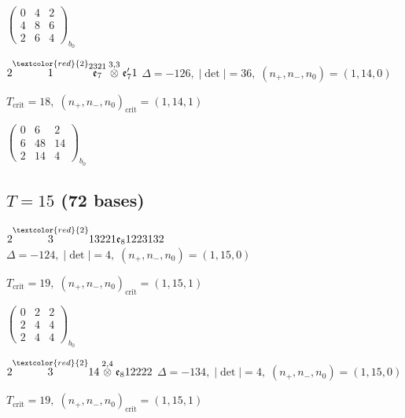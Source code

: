 \documentclass[10pt]{article}
\begin{document}
\hspace{2em}$\left(\begin{smallmatrix}0 & 4 & 2 \\ 4 & 8 & 6 \\ 2 & 6 & 4\end{smallmatrix}\right)_{\!b_0}$

\smallskip

$2\overset{\textcolor{red}{2}}{1}\overset{2321}{\mathfrak{e}_7}\overset{3,3}{\otimes}\mathfrak{e}_7'1$ \quad $\Delta=-126,\; |\det|=36,\; (n_+,n_-,n_0)=(1,14,0)$

\hspace{1em}$T_{\text{crit}}=18,\; (n_+,n_-,n_0)_{\text{crit}}=(1,14,1)$

\hspace{2em}$\left(\begin{smallmatrix}0 & 6 & 2 \\ 6 & 48 & 14 \\ 2 & 14 & 4\end{smallmatrix}\right)_{\!b_0}$


\subsection*{$T = 15$ \quad (72 bases)}
\smallskip

$2\overset{\textcolor{red}{2}}{3}13221\mathfrak{e}_81223132$ \quad $\Delta=-124,\; |\det|=4,\; (n_+,n_-,n_0)=(1,15,0)$

\hspace{1em}$T_{\text{crit}}=19,\; (n_+,n_-,n_0)_{\text{crit}}=(1,15,1)$

\hspace{2em}$\left(\begin{smallmatrix}0 & 2 & 2 \\ 2 & 4 & 4 \\ 2 & 4 & 4\end{smallmatrix}\right)_{\!b_0}$

\smallskip

$2\overset{\textcolor{red}{2}}{3}14\overset{2,4}{\otimes}\mathfrak{e}_812222$ \quad $\Delta=-134,\; |\det|=4,\; (n_+,n_-,n_0)=(1,15,0)$

\hspace{1em}$T_{\text{crit}}=19,\; (n_+,n_-,n_0)_{\text{crit}}=(1,15,1)$
\end{document}
